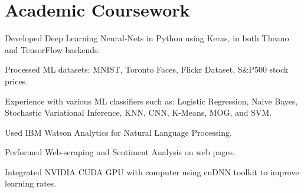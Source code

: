 \documentclass[]{deedy-resume-openfont}
\begin{document}
\begin{minipage}[t]{0.61\textwidth} 


\section{Academic Coursework}

{}
\vspace{\topsep} %
\begin{tightemize} 
\item Developed Deep Learning Neural-Nets in Python using Keras, in both Theano and TensorFlow backends.
\item Processed ML datasets: MNIST, Toronto Faces, Flickr Dataset, S\&P500 stock prices.
\item Experience with various ML classifiers such as: Logistic Regression, Naive Bayes, Stochastic Variational Inference, KNN, CNN, K-Means, MOG, and SVM.
\item Used IBM Watson Analytics for Natural Language Processing.
\item Performed Web-scraping and Sentiment Analysis on web pages.
\item Integrated NVIDIA CUDA GPU with computer using cuDNN toolkit to improve learning rates.
\end{tightemize}
\sectionsep

\iffalse
\runsubsection{Advanced Manufacturing}
\descript{}
\begin{tightemize} 
\item Used data analysis techniques to perform preventative maintenance on heavy machinery.
\item Used Systems Engineering fundamentals and best practices at a high level of implementation.
\item Researched the impact of Artificial Intelligence in Manufacturing and the impact on Operations Management.
\end{tightemize}
\sectionsep
\fi


\end{minipage}
\end{document}
